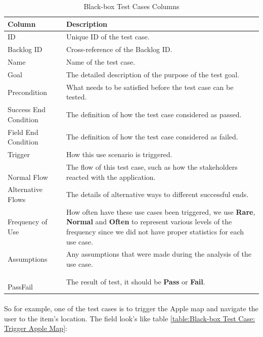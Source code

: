\documentclass[12pt,a4paper]{article}
\begin{document}
          \begin{table}[H]
            \centering
              \begin{tabularx}{\textwidth}{l X}
                \hline
                Column & Description  \\ \hline
                ID & Unique ID of the test case. \\ 
                Backlog ID & Cross-reference of the Backlog ID. \\ 
                Name & Name of the test case.  \\ 
                Goal & The detailed description of the purpose of the test goal. \\ 
                Precondition & What needs to be satisfied before the test case can be tested.\\
                Success End Condition & The definition of how the test case considered as passed. \\
                Field End Condition & The definition of how the test case considered as failed. \\
                Trigger & How this use scenario is triggered.\\
                Normal Flow & The flow of this test case, such as how the stakeholders reacted with the application.\\
                Alternative Flows & The details of alternative ways to different successful ends.\\
                Frequency of Use & How often have these use cases been triggered, we use {\bf Rare}, {\bf Normal} and {\bf Often} to represent various levels of the frequency since we did not have proper statistics for each use case.\\
                Assumptions & Any assumptions that were made during the analysis of the use case. \\
                Pass\/Fail & The result of test, it should be {\bf Pass} or {\bf Fail}. \\
                \hline
              \end{tabularx}
              \caption[Table caption text]{Black-box Test Cases Columns}
              \label{table:Black-box Test Cases Columns}
          \end{table}

          \paragraph{} So for example, one of the test cases is to trigger the Apple map and navigate the user to the item's location. The field look's like table \ref{table:Black-box Test Case: Trigger Apple Map}:
\end{document}
